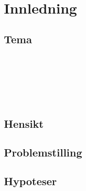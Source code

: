 \section{Innledning}

\subsection{Tema}

\parencite{datatilsynet_personvern}\\
\parencite{regjeringen_personvern}\\
\parencite{regjeringen_gdpr}\\
\parencite{regjeringen_nylov}\\
\parencite{test}\\

\subsection{Hensikt}

\subsection{Problemstilling}

\subsection{Hypoteser}

\newpage
